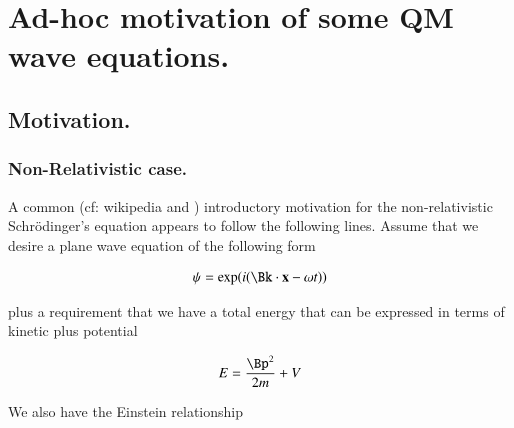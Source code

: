 
%
%



\chapter{Ad-hoc motivation of some QM wave equations. }
\label{chap:sch}
\date{ Dec 13, 2008.  sch.tex }

%



\section{Motivation. }

\subsection{Non-Relativistic case. }

A common (cf: wikipedia and \citep{french1998iqp}) introductory motivation for the non-relativistic Schr\"{o}dinger's equation appears to follow the following lines.  Assume that
we desire a plane wave equation of the following form

\begin{align*}
\psi = \exp(i (\Bk \cdot \Bx - \omega t))
\end{align*}

plus a requirement that we have a total energy that can be expressed in terms of kinetic plus potential

\begin{align}\label{eqn:sch:energy}
E = \frac{\Bp^2}{2m} + V
\end{align}

We also have the Einstein relationship

